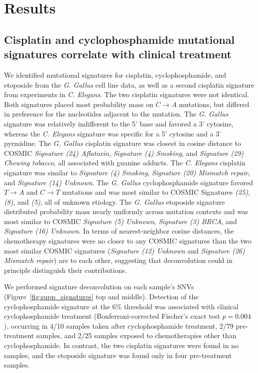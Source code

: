 \section*{Results}

\subsection*{Cisplatin and cyclophosphamide mutational signatures correlate with clinical treatment}
We identified mutational signatures for cisplatin, cyclophosphamide, and etoposide from the \textit{G. Gallus} cell line data, as well as a second cisplatin signature from experiments in \textit{C. Elegans}. The two cisplatin signatures were not identical. Both signatures placed most probability mass on $C \rightarrow A$ mutations, but differed in preference for the nucleotides adjacent to the mutation. The \textit{G. Gallus} signature was relatively indifferent to the 5' base and favored a 3' cytosine, whereas the \textit{C. Elegans} signature was specific for a 5' cytosine and a 3' pyrmidine. The \textit{G. Gallus} cisplatin signature was closest in cosine distance to COSMIC \textit{Signature (24) Aflatoxin}, \textit{Signature (4) Smoking}, and \textit{Signature (29) Chewing tobacco}, all associated with guanine adducts. The \textit{C. Elegans} cisplatin signature was similar to \textit{Signature (4) Smoking}, \textit{Signature (20) Mismatch repair}, and \textit{Signature (14) Unknown}. The \textit{G. Gallus} cyclophosphamide signature favored $T \rightarrow A$ and $C \rightarrow T$ mutations and was most similar to COSMIC Signatures \textit{(25)}, \textit{(8)}, and \textit{(5)}, all of unknown etiology. The \textit{G. Gallus} etoposide signature distributed probability mass nearly uniformly across mutation contexts and was most similar to COSMIC \textit{Signature (5) Unknown}, \textit{Signature (3) BRCA}, and \textit{Signature (16) Unknown}. In terms of nearest-neighbor cosine distances, the chemotherapy signatures were no closer to any COSMIC signatures than the two most similar COSMIC signatures (\textit{Signature (12) Unknown} and \textit{Signature (26) Mismatch repair}) are to each other, suggesting that deconvolution could in principle distinguish their contributions.

We performed signature deconvolution on each sample's SNVs (Figure~\ref{fig:supp_signatures} top and middle). Detection of the cyclophosphamide signature at the 6\% threshold was associated with clinical cyclophosphamide treatment (Bonferroni-corrected Fischer's exact test $p = 0.004$), occurring in 4/10 samples taken after cyclophosphamide treatment, 2/79 pre-treatment samples, and 2/25 samples exposed to chemotherapies other than cyclophosphamide. In contrast, the two cisplatin signatures were found in no samples, and the etoposide signature was found only in four pre-treatment samples.

